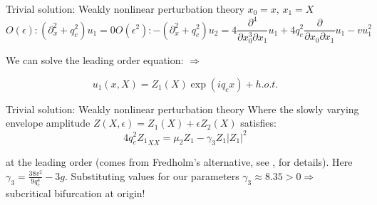 \documentclass{beamer}
\begin{document}
\begin{frame}{Trivial solution: Weakly nonlinear perturbation theory}
 $x_{0} = x$, $x_{1}= X$
\begin{subequations}\label{eq23}
    \begin{equation}
        O(\epsilon): (\partial_{x}^{2}+q_{c}^{2})u_{1}=0
    \end{equation}
    
    \begin{equation}
        O(\epsilon^{2}): -(\partial_{x}^{2}+q_{c}^{2})u_{2}=4\frac{\partial^{4}}{\partial x_{0}^{3}\partial x_{1}}u_{1}+4q_{c}^{2}\frac{\partial}{\partial x_{0}\partial {x_{1}}}u_{1}-vu_{1}^{2}
    \end{equation}
\end{subequations}

We can solve the leading order equation: $\Rightarrow$ 

    \begin{equation}
        u_{1}(x,X)=Z_{1}(X)\exp{(iq_{c}x)}
        +h.o.t.
    \end{equation}

\end{frame}
\begin{frame}{Trivial solution: Weakly nonlinear perturbation theory}
Where the slowly varying envelope amplitude $Z(X, \epsilon) = Z_{1}(X) + \epsilon Z_{2}(X)$ satisfies:
\begin{equation}\label{eq:ampl_eqn}
 4q_{c}^{2}{Z_{1}}_{XX} = \mu_{2}Z_{1} - \gamma_{3}Z_{1}|Z_{1}|^{2}
\end{equation}

 at the leading order (comes from Fredholm's alternative, see \cite{burke2007snakes}, \cite{knobloch2015spatial} for details). Here $\gamma_{3} = \frac{38 v^{2}}{9q_{c}^{4}} - 3g$. Substituting values for our parameters $\gamma_{3} \approx 8.35 > 0 \Rightarrow$ subcritical bifurcation at origin!
\end{frame}
\end{document}
